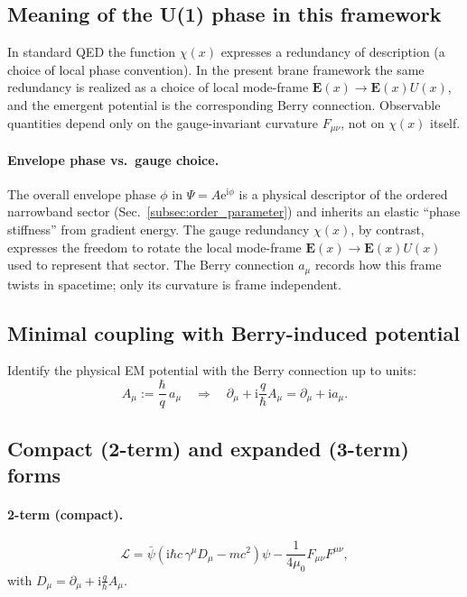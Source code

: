 \documentclass[11pt,a4paper]{article}
\providecommand{\ii}{\mathrm{i}}
\providecommand{\e}{\mathrm{e}}
\newcommand{\Lag}{\mathcal{L}}              %
\newcommand{\covD}{D}                       %
\newcommand{\psibar}{\bar{\psi}}
\newcommand{\gamm}{\gamma}
\begin{document}
\subsection{Meaning of the U(1) phase in this framework}
In standard QED the function $\chi(x)$ expresses a redundancy of description (a choice of local phase convention).
In the present brane framework the same redundancy is realized as a choice of local mode-frame
$\mathbf{E}(x)\to \mathbf{E}(x)U(x)$, and the emergent potential is the corresponding Berry connection.
Observable quantities depend only on the gauge-invariant curvature $F_{\mu\nu}$, not on $\chi(x)$ itself.




\paragraph{Envelope phase vs.\ gauge choice.}
The overall envelope phase $\phi$ in $\Psi=A\e^{\ii\phi}$ is a physical descriptor of the ordered narrowband sector
(Sec.~\ref{subsec:order_parameter}) and inherits an elastic ``phase stiffness'' from gradient energy.
The gauge redundancy $\chi(x)$, by contrast, expresses the freedom to rotate the local mode-frame
$\mathbf{E}(x)\to \mathbf{E}(x)U(x)$ used to represent that sector. The Berry connection $a_\mu$ records how this
frame twists in spacetime; only its curvature is frame independent.

\subsection{Minimal coupling with Berry-induced potential}
Identify the physical EM potential with the Berry connection up to units:
\[
A_\mu := \frac{\hbar}{q}\,a_\mu
\quad\Rightarrow\quad
\partial_\mu + \ii \frac{q}{\hbar}A_\mu = \partial_\mu + \ii a_\mu.
\]

\subsection{Compact (2-term) and expanded (3-term) forms}
\paragraph{2-term (compact).}
\begin{equation}
\Lag
=
\psibar\left(\ii\hbar c\,\gamm^\mu \covD_\mu - mc^2\right)\psi
-
\frac{1}{4\mu_0}F_{\mu\nu}F^{\mu\nu},
\label{eq:Lag_compact}
\end{equation}
with \(\covD_\mu=\partial_\mu + \ii\frac{q}{\hbar}A_\mu\).
\end{document}
